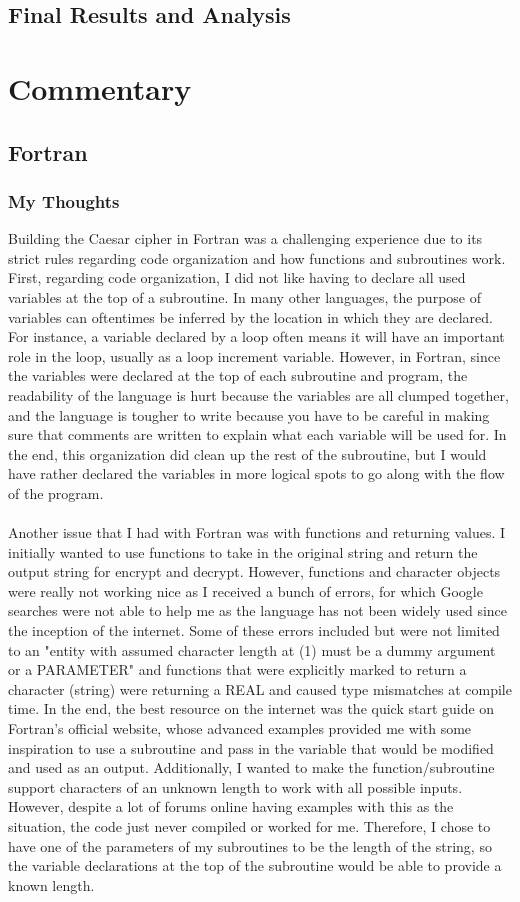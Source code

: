\documentclass[letterpaper, 10pt, DIV=13]{scrartcl}
\numberwithin{equation}{section}
\numberwithin{figure}{section}
\numberwithin{table}{section}
\begin{document}
\subsection{Final Results and Analysis}

\section{Commentary}
\subsection{Fortran}
\subsubsection{My Thoughts}
Building the Caesar cipher in Fortran was a challenging experience due to its strict rules regarding code organization and how functions and subroutines work. First, regarding code organization, I did not like having to declare all used variables at the top of a subroutine. In many other languages, the purpose of variables can oftentimes be inferred by the location in which they are declared. For instance, a variable declared by a loop often means it will have an important role in the loop, usually as a loop increment variable. However, in Fortran, since the variables were declared at the top of each subroutine and program, the readability of the language is hurt because the variables are all clumped together, and the language is tougher to write because you have to be careful in making sure that comments are written to explain what each variable will be used for. In the end, this organization did clean up the rest of the subroutine, but I would have rather declared the variables in more logical spots to go along with the flow of the program.
\\ \\
Another issue that I had with Fortran was with functions and returning values. I initially wanted to use functions to take in the original string and return the output string for encrypt and decrypt. However, functions and character objects were really not working nice as I received a bunch of errors, for which Google searches were not able to help me as the language has not been widely used since the inception of the internet. Some of these errors included but were not limited to an "entity with assumed character length at (1) must be a dummy argument or a PARAMETER" and functions that were explicitly marked to return a character (string) were returning a REAL and caused type mismatches at compile time. In the end, the best resource on the internet was the quick start guide on Fortran's official website, whose advanced examples provided me with some inspiration to use a subroutine and pass in the variable that would be modified and used as an output. Additionally, I wanted to make the function/subroutine support characters of an unknown length to work with all possible inputs. However, despite a lot of forums online having examples with this as the situation, the code just never compiled or worked for me. Therefore, I chose to have one of the parameters of my subroutines to be the length of the string, so the variable declarations at the top of the subroutine would be able to provide a known length.
\end{document}
